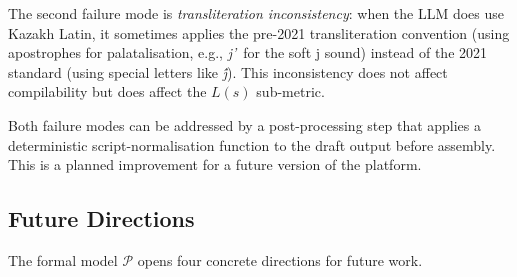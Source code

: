 The second failure mode is \emph{transliteration inconsistency}: when the LLM does
use Kazakh Latin, it sometimes applies the pre-2021 transliteration convention
(using apostrophes for palatalisation, e.g., \textit{j'}\ for the soft j sound)
instead of the 2021 standard (using special letters like \textit{\'j}).
This inconsistency does not affect compilability but does affect the $L(s)$ sub-metric.

Both failure modes can be addressed by a post-processing step that applies a
deterministic script-normalisation function to the draft output before assembly.
This is a planned improvement for a future version of the platform.

\subsection{Future Directions}

The formal model $\mathcal{P}$ opens four concrete directions for future work.

